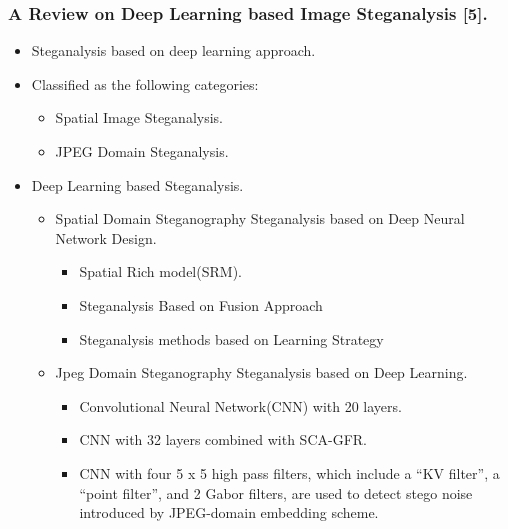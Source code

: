 \documentclass{beamer} %
\theoremstyle{definition} %
\begin{document}
\begin{frame}
\frametitle{A Review on Deep Learning based Image Steganalysis [5]. }
\begin{itemize}
	\item{Steganalysis based on deep learning approach.}
	\item{Classified as the following categories:}
	\begin{itemize}
		\item Spatial Image Steganalysis.
		\item JPEG Domain  Steganalysis.
	\end{itemize}
\end{itemize}
\begin{itemize}
	 \item{Deep Learning based Steganalysis.}
	\begin{itemize}
		\item {Spatial Domain Steganography Steganalysis based on Deep Neural Network Design.}
		\begin{itemize}
			\item Spatial Rich model(SRM).
			\item Steganalysis Based on Fusion Approach 
			\item Steganalysis methods based on Learning Strategy
		\end{itemize}
	    \item{ Jpeg Domain Steganography Steganalysis based on Deep
	    	Learning.}
    	\begin{itemize}
    		\item Convolutional Neural Network(CNN) with 20 layers.
    		\item CNN with 32 layers combined with  SCA-GFR.
    		\item CNN with four 5 x 5 high pass filters, which
    		include a “KV filter”, a “point filter”, and 2 Gabor filters, are
    		used to detect stego noise introduced by JPEG-domain
    		embedding scheme.
    	\end{itemize}
	\end{itemize}
\end{itemize}
\end{frame}
\end{document}
